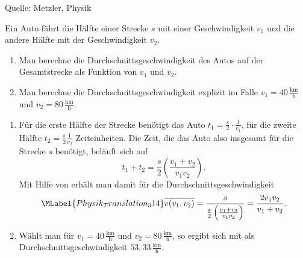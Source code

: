 \begin{MExercises}
\begin{MExercise}
\begin{MSolution}
       \end{MSolution}
       
       Quelle: Metzler, Physik   
       \end{MExercise}
       
       \begin{MExercise}
            Ein Auto f\"ahrt die H\"alfte einer Strecke $s$ mit einer Geschwindigkeit $v_1$ und die andere H\"alfte mit der Geschwindigkeit $v_2$.
            \begin{enumerate} 
            \item Man berechne die Durchschnittsgeschwindigkeit des Autos auf der Gesamtstrecke als Funktion von $v_1$ und $v_2$.
            \item Man berechne die Durchschnittsgeschwindigkeit explizit im Falle $v_1= 40 \,\frac{\text{km}}{\text{h}}$ und $v_2= 80 \,\frac{\text{km}}{\text{h}}$.
            \end{enumerate}
            
            \begin{MSolution}
            \begin{enumerate}
            \item F\"ur die erste H\"alfte der Strecke ben\"otigt das Auto $t_1=\frac{s}{2}\cdot\frac{1}{v_1}$, f\"ur die zweite H\"alfte $t_2=\frac{s}{2}\frac{1}{v_2}$ Zeiteinheiten. Die Zeit, die das Auto also insgesamt f\"ur die Strecke $s$ ben\"otigt, bel\"auft sich auf
            \begin{equation*}
            t_1+t_2=\frac{s}{2}\left(\frac{v_1+v_2}{v_1v_2}\right).
            \end{equation*}Mit Hilfe von  erh\"alt man damit f\"ur die Durchschnittsgeschwindigkeit
            \begin{equation}\MLabel{Physik_Translation_314}
            \overline{v(v_1,v_2)}=\frac{s}{\frac{s}{2}\left(\frac{v_1+v_2}{v_1v_2}\right)}=\frac{2v_1v_2}{v_1+v_2}.
            \end{equation}
            \item W\"ahlt man f\"ur $v_1= 40\, \frac{\text{km}}{\text{h}}$ und $v_2= 80 \,\frac{\text{km}}{\text{h}}$, so ergibt sich mit  als Durchschnittsgeschwindigkeit ${53,33} \,\frac{\text{km}}{\text{h}}$.\\
            \end{enumerate}
            \end{MSolution}
            

\end{MExercise}
\end{MExercises}
